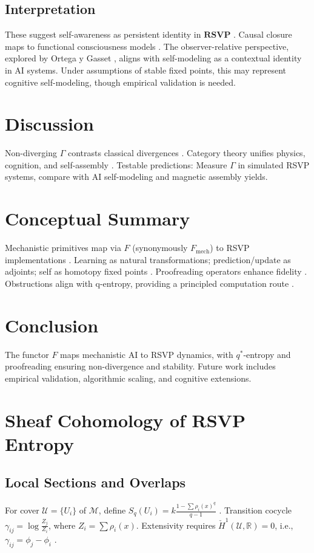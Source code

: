 \documentclass{article}
\theoremstyle{plain}
\theoremstyle{definition}
\begin{document}
\subsection{Interpretation}
These suggest self-awareness as persistent identity in $\mathbf{RSVP}$ \cite{Bennett2025}. Causal closure maps to functional consciousness models \cite{Pearl2009,Goguen1992}. The observer-relative perspective, explored by Ortega y Gasset \cite{Ortega1931}, aligns with self-modeling as a contextual identity in AI systems. Under assumptions of stable fixed points, this may represent cognitive self-modeling, though empirical validation is needed.

\section{Discussion}

Non-diverging $\Gamma$ contrasts classical divergences \cite{Soares2023}. Category theory unifies physics, cognition, and self-assembly \cite{Spivak2014,Goguen1992,Liang2025}. Testable predictions: Measure $\Gamma$ in simulated RSVP systems, compare with AI self-modeling and magnetic assembly yields.

\section{Conceptual Summary}
Mechanistic primitives map via $F$ (synonymously $F_\text{mech}$) to RSVP implementations \cite{Bennett2025,Spivak2014}. Learning as natural transformations; prediction/update as adjoints; self as homotopy fixed points \cite{Awodey2010}. Proofreading operators enhance fidelity \cite{Liang2025}. Obstructions align with q-entropy, providing a principled computation route \cite{Soares2024,Tsallis1988}.

\section{Conclusion}
The functor $F$ maps mechanistic AI to RSVP dynamics, with $q^*$-entropy and proofreading ensuring non-divergence and stability. Future work includes empirical validation, algorithmic scaling, and cognitive extensions.

\appendix

\section{Sheaf Cohomology of RSVP Entropy}
\FloatBarrier
\subsection{Local Sections and Overlaps}
For cover $\mathcal{U} = \{U_i\}$ of $\mathcal{M}$, define $S_q(U_i) = k \frac{1 - \sum \rho_i(x)^q}{q-1}$ \cite{Tsallis1988}. Transition cocycle $\gamma_{ij} = \log \frac{Z_j}{Z_i}$, where $Z_i = \sum \rho_i(x)$. Extensivity requires $\check{H}^1(\mathcal{U}, \mathbb{R}) = 0$, i.e., $\gamma_{ij} = \phi_j - \phi_i$ \cite{MacLane1992,Soares2024}.
\end{document}

